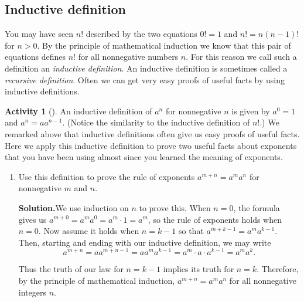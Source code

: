 \documentclass[10pt,]{book}
\theoremstyle{plain}
\theoremstyle{definition}
\newtheorem{activity}[project]{Activity}
\numberwithin{equation}{chapter}
\begin{document}
\subsection[{Inductive definition}]{Inductive definition}\label{subsection-7}
You may have seen \(n!\) described by the two equations \(0!=1\) and \(n!=n(n-1)!\) for \(n>0\). By the principle of mathematical induction we know that this pair of equations defines \(n!\) for all nonnegative numbers \(n\). For this reason we call such a definition an \emph{inductive definition}. An inductive definition is sometimes called a \emph{recursive definition}. Often we can get very easy proofs of useful facts by using inductive definitions.%
\begin{activity}[]\label{activity-27}
An inductive definition of \(a^n\) for nonnegative \(n\) is given by \(a^0=1\) and \(a^n=aa^{n-1}\). (Notice the similarity to the inductive definition of \(n!\).) We remarked above that inductive definitions often give us easy proofs of useful facts. Here we apply this inductive definition to prove two useful facts about exponents that you have been using almost since you learned the meaning of exponents.%
~\par
\begin{enumerate}[label=(\alph*)]
 \item Use this definition to prove the rule of exponents \(a^{m+n}=a^ma^n\) for nonnegative \(m\) and \(n\).%
\par\medskip\noindent%
\textbf{Solution.}\quad We use induction on \(n\) to prove this. When \(n=0\), the formula gives us \(a^{m+0} =a^ma^0=a^m\cdot 1=a^m\), so the rule of exponents holds when \(n=0\). Now assume it holds when \(n=k-1\) so that \(a^{m+k-1}=a^ma^{k-1}\). Then, starting and ending with our inductive definition, we may write%
\begin{equation*}
a^{m+n}=aa^{m+n-1}=aa^ma^{k-1}=a^m\cdot a\cdot a^{k-1}=a^ma^k.
\end{equation*}
%
\par
Thus the truth of our law for \(n=k-1\) implies its truth for \(n=k\). Therefore, by the principle of mathematical induction, \(a^{m+n}=a^ma^n\) for all nonnegative integers \(n\).%


\end{enumerate}
\end{activity}
\end{document}

